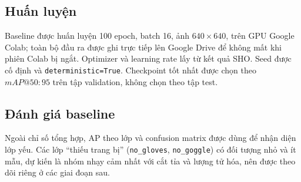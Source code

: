 \subsection{Huấn luyện}

Baseline được huấn luyện 100 epoch, batch 16, ảnh $640\times640$, trên GPU
Google Colab; toàn bộ đầu ra được ghi trực tiếp lên Google Drive để không mất khi
phiên Colab bị ngắt. Optimizer và learning rate lấy từ kết quả SHO. Seed được cố
định và \texttt{deterministic=True}. Checkpoint tốt nhất được chọn theo
$mAP@50{:}95$ trên tập validation, không chọn theo tập test.

\subsection{Đánh giá baseline}

\begin{table}[H]
\centering
\caption{Kết quả chất lượng của mô hình baseline trên tập test Construction-PPE}
\label{tab:baseline-quality}
\end{table}

Ngoài chỉ số tổng hợp, AP theo lớp và confusion matrix được dùng để nhận diện
lớp yếu. Các lớp ``thiếu trang bị'' (\texttt{no\_gloves}, \texttt{no\_goggle}) có
đối tượng nhỏ và ít mẫu, dự kiến là nhóm nhạy cảm nhất với cắt tỉa và lượng tử
hóa, nên được theo dõi riêng ở các giai đoạn sau.
